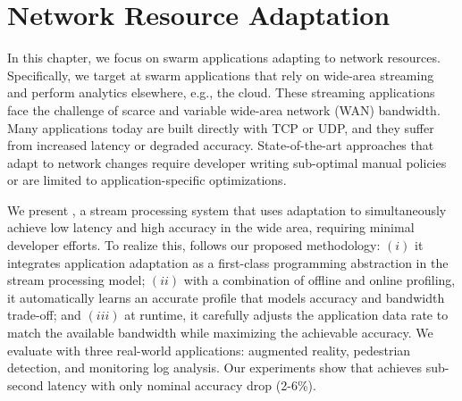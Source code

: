 \documentclass[thesis.tex]{subfiles}
\begin{document}
\chapter{Network Resource Adaptation}
\label{cha:netw-reso-adapt}

In this chapter, we focus on swarm applications adapting to network
resources. Specifically, we target at swarm applications that rely on wide-area
streaming and perform analytics elsewhere, e.g., the cloud. These streaming
applications face the challenge of scarce and variable wide-area network (WAN)
bandwidth. Many applications today are built directly with TCP or UDP, and they
suffer from increased latency or degraded accuracy. State-of-the-art approaches
that adapt to network changes require developer writing sub-optimal manual
policies or are limited to application-specific optimizations.

We present \awstream{}, a stream processing system that uses adaptation to
simultaneously achieve low latency and high accuracy in the wide area, requiring
minimal developer efforts. To realize this, \awstream{} follows our proposed
methodology: $(i)$ it integrates application adaptation as a first-class
programming abstraction in the stream processing model; $(ii)$ with a
combination of offline and online profiling, it automatically learns an accurate
profile that models accuracy and bandwidth trade-off; and $(iii)$ at runtime, it
carefully adjusts the application data rate to match the available bandwidth
while maximizing the achievable accuracy. We evaluate \awstream{} with three
real-world applications: augmented reality, pedestrian detection, and monitoring
log analysis. Our experiments show that \awstream{} achieves sub-second latency
with only nominal accuracy drop (2-6\%).










\end{document}
